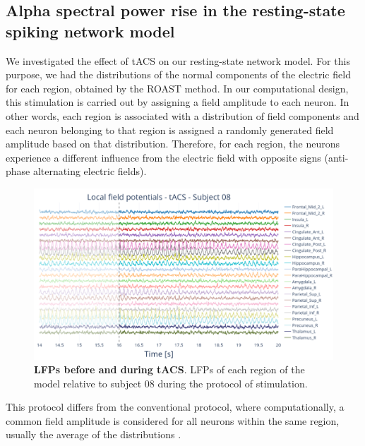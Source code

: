 \documentclass[../main.tex]{subfiles}
\begin{document}
\subsection{Alpha spectral power rise in the resting-state spiking network model}
We investigated the effect of tACS on our resting-state network model. 
For this purpose, we had the distributions of the normal components of the electric field for each region, obtained by the ROAST method.
In our computational design, this stimulation is carried out by assigning a field amplitude to each neuron.
In other words, each region is associated with a distribution of field components and each neuron belonging to that region is assigned a randomly generated field amplitude based on that distribution.
Therefore, for each region, the neurons experience a different influence from the electric field with opposite signs (anti-phase alternating electric fields).
\begin{figure}[htbp]
    \centering
\includegraphics[width=\textwidth]{chapter3/figures/lfps_stimulation_7.png}
    \caption{\textbf{LFPs before and during tACS}.
    LFPs of each region of the model relative to subject 08 during the protocol of stimulation.}
    \label{fig:stimulation-output}
\end{figure}
This protocol differs from the conventional protocol, where computationally, a common field amplitude is considered for all neurons within the same region, usually the average of the distributions \citep{merlet_oscillatory_2013}.
\end{document}
